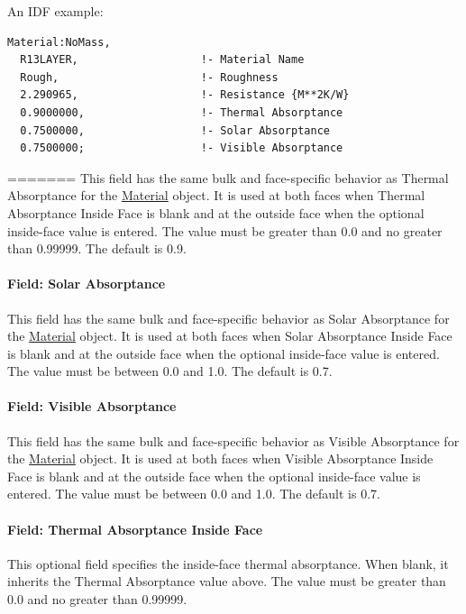 An IDF example:

\begin{lstlisting}
Material:NoMass,
  R13LAYER,                   !- Material Name
  Rough,                      !- Roughness
  2.290965,                   !- Resistance {M**2K/W}
  0.9000000,                  !- Thermal Absorptance
  0.7500000,                  !- Solar Absorptance
  0.7500000;                  !- Visible Absorptance
\end{lstlisting}

=======
This field has the same bulk and face-specific behavior as Thermal Absorptance for the \hyperref[material]{Material} object. It is used at both faces when Thermal Absorptance Inside Face is blank and at the outside face when the optional inside-face value is entered. The value must be greater than 0.0 and no greater than 0.99999. The default is 0.9.

\paragraph{Field: Solar Absorptance}\label{field-solar-absorptance-1}

This field has the same bulk and face-specific behavior as Solar Absorptance for the \hyperref[material]{Material} object. It is used at both faces when Solar Absorptance Inside Face is blank and at the outside face when the optional inside-face value is entered. The value must be between 0.0 and 1.0. The default is 0.7.

\paragraph{Field: Visible Absorptance}\label{field-visible-absorptance-1}

This field has the same bulk and face-specific behavior as Visible Absorptance for the \hyperref[material]{Material} object. It is used at both faces when Visible Absorptance Inside Face is blank and at the outside face when the optional inside-face value is entered. The value must be between 0.0 and 1.0. The default is 0.7.

\paragraph{Field: Thermal Absorptance Inside Face}\label{field-thermal-absorptance-inside-face-1}

This optional field specifies the inside-face thermal absorptance. When blank, it inherits the Thermal Absorptance value above. The value must be greater than 0.0 and no greater than 0.99999.


